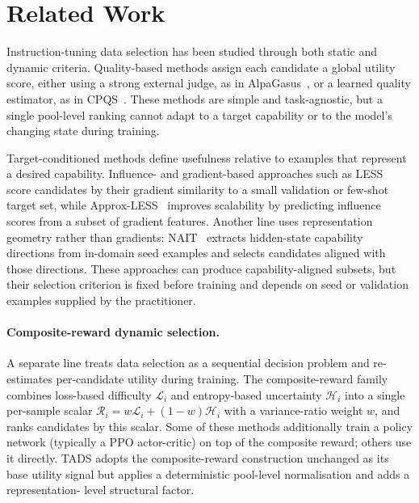 \section{Related Work}
\label{sec:related}

Instruction-tuning data selection has been studied through both
static and dynamic criteria. Quality-based methods assign each
candidate a global utility score, either using a strong external
judge, as in AlpaGasus~\cite{alpagasus}, or a learned quality
estimator, as in CPQS~\cite{cpqs2026}. These methods are simple and
task-agnostic, but a single pool-level ranking cannot adapt to a
target capability or to the model's changing state during training.

Target-conditioned methods define usefulness relative to examples
that represent a desired capability. Influence- and gradient-based
approaches such as LESS~\cite{less} score candidates by their
gradient similarity to a small validation or few-shot target set,
while Approx-LESS~\cite{approxless} improves scalability by
predicting influence scores from a subset of gradient features.
Another line uses representation geometry rather than gradients:
NAIT~\cite{nait2026} extracts hidden-state capability directions
from in-domain seed examples and selects candidates aligned with
those directions. These approaches can produce capability-aligned
subsets, but their selection criterion is fixed before training and
depends on seed or validation examples supplied by the practitioner.

\paragraph{Composite-reward dynamic selection.}
A separate line treats data selection as a sequential decision
problem and re-estimates per-candidate utility during training. The
composite-reward family~\cite{kung2023activeit, sun2025dots,
jha2025rl} combines loss-based difficulty $\mathcal{L}_i$ and
entropy-based uncertainty $\mathcal{H}_i$ into a single per-sample
scalar $\mathcal{R}_i = w\mathcal{L}_i + (1-w)\mathcal{H}_i$ with a
variance-ratio weight $w$, and ranks candidates by this scalar.
Some of these methods additionally train a policy network
(typically a PPO actor-critic) on top of the composite reward;
others use it directly. \textsc{TADS} adopts the composite-reward
construction unchanged as its base utility signal but applies a
deterministic pool-level normalisation and adds a representation-
level structural factor.

